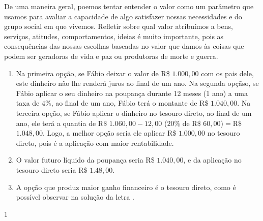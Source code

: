 \begin{reflection}
De uma maneira geral, poemos tentar entender o valor como um parâmetro que usamos para avaliar a capacidade de algo satisfazer nossas necessidades e do grupo social em que vivemos. Refletir sobre qual valor atribuímos a bens, serviços, atitudes, comportamentos, ideias é muito importante, pois as consequências das nossas escolhas baseadas no valor que damos às coisas que podem ser geradoras de vida e paz ou produtoras de morte e guerra.
\end{reflection}

\clearpage
{}

\begin{resposta}{}
{
  \begin{enumerate}
    \item Na primeira opção, se Fábio deixar o valor de R\$ $1.000{,}00$ com os pais dele, este dinheiro não lhe renderá juros ao final de um ano. Na segunda opçãso, se Fábio aplicar o seu dinheiro na poupança durante 12 meses (1 ano) a uma taxa de $4$\%, ao final de um ano, Fábio terá o montante de R\$ $1.040{,}00$. Na terceira opção, se Fábio aplicar o dinheiro no tesouro direto, ao final de um ano, ele terá a quantia de R\$ $1.060{,}00-12{,}00$ ($20$\% de R\$ $60{,}00$)$=$R\$ $1.048{,}00$. Logo, a melhor opção seria ele aplicar R\$ $1.000,00$ no tesouro direto, pois é a aplicação com maior rentabilidade.
    \item O valor futuro líquido da poupança seria R\$ $1.040{,}00$, e da aplicação no tesouro direto seria R\$ $1.48{,}00$.
    \item A opção que produz maior ganho financeiro é o tesouro direto, como é possível observar na solução da letra .
  \end{enumerate}
}{1}
\end{resposta}

